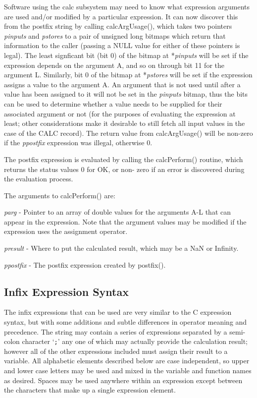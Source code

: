 Software using the calc subsystem may need to know what expression arguments are used and/or modified by a particular 
expression. It can now discover this from the postfix string by calling calcArgUsage(), which takes two pointers \emph{pinputs} 
and \emph{pstores} to a pair of unsigned long bitmaps which return that information to the caller (passing a NULL value for either 
of these pointers is legal). The least signficant bit (bit 0) of the bitmap at *\emph{pinputs} will be set if the expression depends on 
the argument A, and so on through bit 11 for the argument L. Similarly, bit 0 of the bitmap at *\emph{pstores} will be set if the 
expression assigns a value to the argument A. An argument that is not used until after a value has been assigned to it will 
not be set in the \emph{pinputs} bitmap, thus the bits can be used to determine whether a value needs to be supplied for their 
associated argument or not (for the purposes of evaluating the expression at least; other considerations make it desirable 
to still fetch all input values in the case of the CALC record). The return value from calcArgUsage() will be non-zero if 
the \emph{ppostfix} expression was illegal, otherwise 0.

The postfix expression is evaluated by calling the calcPerform() routine, which returns the status values 0 for OK, or non-
zero if an error is discovered during the evaluation process.

The arguments to calcPerform() are:

\begin{description}\item \emph{parg} - Pointer to an array of double values for the arguments A-L that can appear in the expression. Note that the 
argument values may be modified if the expression uses the assignment operator.

\item \emph{presult} - Where to put the calculated result, which may be a NaN or Infinity.

\item \emph{ppostfix} - The postfix expression created by postfix().

\end{description}\subsection{Infix Expression Syntax}

The infix expressions that can be used are very similar to the C expression syntax, but with some additions and subtle 
differences in operator meaning and precedence. The string may contain a series of expressions separated by a semi-colon 
character `\verb|;|' any one of which may actually provide the calculation result; however all of the other expressions included 
must assign their result to a variable. All alphabetic elements described below are case independent, so upper and lower 
case letters may be used and mixed in the variable and function names as desired. Spaces may be used anywhere within an 
expression except between the characters that make up a single expression element.

